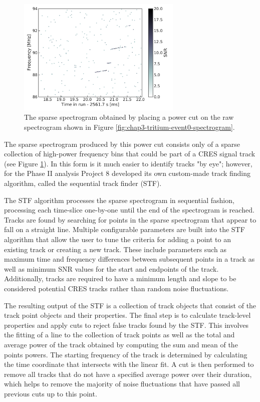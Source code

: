 \begin{figure}[htbp]
    \centering
    \includegraphics*[width=0.7\textwidth]{figs/Chapter-3/230621_t_event_zero_sparse_spectrogram_zoom.pdf}
    \caption{\label{fig:chap3-sparse-spectrogram} The sparse spectrogram obtained by placing a power cut on the raw spectrogram shown in Figure \ref{fig:chap3-tritium-event0-spectrogram}.}
\end{figure}

The sparse spectrogram produced by this power cut consists only of a sparse collection of high-power frequency bins that could be part of a CRES signal track (see Figure \ref{fig:chap3-sparse-spectrogram}). In this form is it much easier to identify tracks "by eye"; however, for the Phase II analysis Project 8 developed its own custom-made track finding algorithm, called the sequential track finder (STF). 

The STF algorithm processes the sparse spectrogram in sequential fashion, processing each time-slice one-by-one until the end of the spectrogram is reached. Tracks are found by searching for points in the sparse spectrogram that appear to fall on a straight line. Multiple configurable parameters are built into the STF algorithm that allow the user to tune the criteria for adding a point to an existing track or creating a new track. These include parameters such as maximum time and frequency differences between subsequent points in a track as well as minimum SNR values for the start and endpoints of the track. Additionally, tracks are required to have a minimum length and slope to be considered potential CRES tracks rather than random noise fluctuations. 

The resulting output of the STF is a collection of track objects that consist of the track point objects and their properties. The final step is to calculate track-level properties and apply cuts to reject false tracks found by the STF. This involves the fitting of a line to the collection of track points as well as the total and average power of the track obtained by computing the sum and mean of the points powers. The starting frequency of the track is determined by calculating the time coordinate that  intersects with the linear fit. A cut is then performed to remove all tracks that do not have a specified average power over their duration, which helps to remove the majority of noise fluctuations that have passed all previous cuts up to this point.

